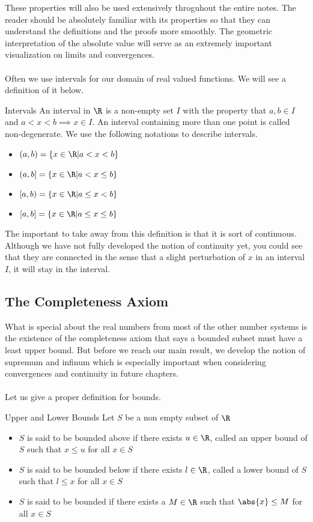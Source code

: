 These properties will also be used extensively throguhout the entire notes. The reader should be absolutely familiar with its properties so that they can understand the definitions and the proofs more smoothly. The geometric interpretation of the absolute value will serve as an extremely important visualization on limits and convergences. \\~\\

Often we use intervals for our domain of real valued functions. We will see a definition of it below. 

\begin{defn}{Intervals}{} An interval in $\R$ is a non-empty set $I$ with the property that $a,b\in I$ and $a<x<b\implies x\in I$. An interval containing more than one point is called non-degenerate. We use the following notations to describe intervals. 
\begin{itemize}
\item $(a,b)=\{x\in\R|a<x<b\}$
\item $(a,b]=\{x\in\R|a<x\leq b\}$
\item $[a,b)=\{x\in\R|a\leq x<b\}$
\item $[a,b]=\{x\in\R|a\leq x\leq b\}$
\end{itemize}
\end{defn}

The important to take away from this definition is that it is sort of continuous. Although we have not fully developed the notion of continuity yet, you could see that they are connected in the sense that a slight perturbation of $x$ in an interval $I$, it will stay in the interval. 

\subsection{The Completeness Axiom}
What is special about the real numbers from most of the other number systems is the existence of the completeness axiom that says a bounded subset must have a least upper bound. But before we reach our main result, we develop the notion of supremum and infinum which is especially important when considering convergences and continuity in future chapters. \\~\\
Let us give a proper definition for bounds. 
\begin{defn}{Upper and Lower Bounds}{} Let $S$ be a non empty subset of $\R$ 
\begin{itemize}
\item $S$ is said to be bounded above if there exists $u\in\R$, called an upper bound of $S$ such that $x\leq u$ for all $x\in S$
\item $S$ is said to be bounded below if there exists $l\in\R$, called a lower bound of $S$ such that $l\leq x$ for all $x\in S$
\item $S$ is said to be bounded if there exists a $M\in\R$ such that $\abs{x}\leq M$ for all $x\in S$
\end{itemize}
\end{defn}


